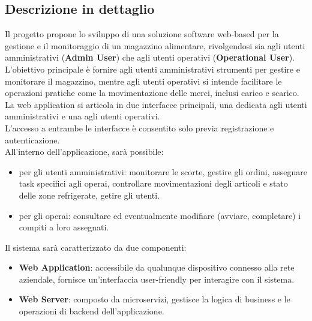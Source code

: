 \subsection{Descrizione in dettaglio}

Il progetto propone lo sviluppo di una soluzione software web-based per la gestione e il monitoraggio di un magazzino
alimentare, rivolgendosi sia agli utenti amministrativi (\textbf{Admin User}) che agli utenti operativi (\textbf{Operational User}).\\
L'obiettivo principale è fornire agli utenti amministrativi strumenti per gestire e monitorare il magazzino,
mentre agli utenti operativi si intende facilitare le operazioni pratiche come la movimentazione delle merci, inclusi carico e scarico.\\
La web application si articola in due interfacce principali, una dedicata agli utenti amministrativi e una agli utenti operativi.\\
L'accesso a entrambe le interfacce è consentito solo previa registrazione e autenticazione.\\
All'interno dell'applicazione, sarà possibile:
\begin{itemize}
    \item per gli utenti amministrativi: monitorare le scorte, gestire gli ordini, assegnare task specifici agli operai, controllare movimentazioni degli articoli e stato delle zone refrigerate, getire gli utenti.
    \item per gli operai: consultare ed eventualmente modifiare (avviare, completare) i compiti a loro assegnati.
\end{itemize}

Il sistema sarà caratterizzato da due componenti:
\begin{itemize}
    \item \textbf{Web Application}: accessibile da qualunque dispositivo connesso alla rete aziendale, fornisce un'interfaccia user-friendly per interagire con il sistema.
    \item \textbf{Web Server}: composto da microservizi, gestisce la logica di business e le operazioni di backend dell'applicazione.
\end{itemize}
\newpage